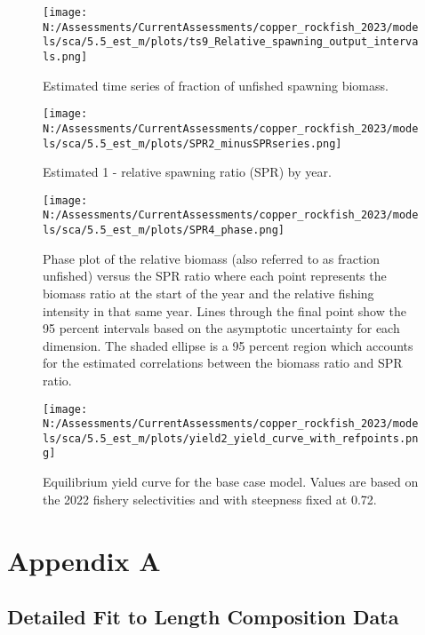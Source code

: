 \documentclass[11pt,
  english,
  letterpaper,
]{article}
\begin{document}
\begin{figure}
\centering
\texttt{[image: N:/Assessments/CurrentAssessments/copper\_rockfish\_2023/models/sca/5.5\_est\_m/plots/ts9\_Relative\_spawning\_output\_intervals.png]}
\caption{Estimated time series of fraction of unfished spawning biomass.\label{fig:depl}}
\end{figure}

\begin{figure}
\centering
\texttt{[image: N:/Assessments/CurrentAssessments/copper\_rockfish\_2023/models/sca/5.5\_est\_m/plots/SPR2\_minusSPRseries.png]}
\caption{Estimated 1 - relative spawning ratio (SPR) by year.\label{fig:1-spr}}
\end{figure}

\clearpage

\begin{figure}
\centering
\texttt{[image: N:/Assessments/CurrentAssessments/copper\_rockfish\_2023/models/sca/5.5\_est\_m/plots/SPR4\_phase.png]}
\caption{Phase plot of the relative biomass (also referred to as fraction unfished) versus the SPR ratio where each point represents the biomass ratio at the start of the year and the relative fishing intensity in that same year. Lines through the final point show the 95 percent intervals based on the asymptotic uncertainty for each dimension. The shaded ellipse is a 95 percent region which accounts for the estimated correlations between the biomass ratio and SPR ratio.\label{fig:phase}}
\end{figure}

\begin{figure}
\centering
\texttt{[image: N:/Assessments/CurrentAssessments/copper\_rockfish\_2023/models/sca/5.5\_est\_m/plots/yield2\_yield\_curve\_with\_refpoints.png]}
\caption{Equilibrium yield curve for the base case model. Values are based on the 2022 fishery selectivities and with steepness fixed at 0.72.\label{fig:yield}}
\end{figure}

\hypertarget{detailed-fit-comps}{%
\section{Appendix A}\label{detailed-fit-comps}}

\hypertarget{length-data}{%
\subsection{Detailed Fit to Length Composition Data}\label{length-data}}
\end{document}
